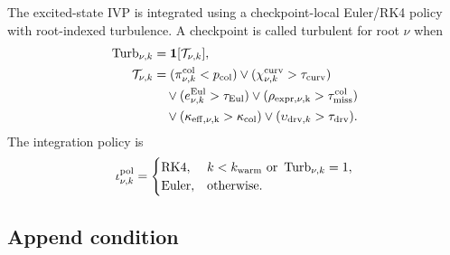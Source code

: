 \documentclass[
  reprint,
  amsmath,
  amssymb,
  aps,
  pra,
  nofootinbib,
  superscriptaddress,
  floatfix
]{revtex4-2}
\newcommand{\drv}{\mathrm{drv}}
\begin{document}
The excited-state IVP is integrated using a checkpoint-local Euler/RK4 policy with root-indexed turbulence.  A checkpoint is called turbulent for root $\nu$ when
\begin{equation}
\begin{aligned}
\operatorname{Turb}_{\nu,k}&=\mathbf 1[\mathcal T_{\nu,k}],\\
\mathcal T_{\nu,k}
&=
(\pi_{\nu,k}^{\rm col}<p_{\rm col})
\vee(\chi_{\nu,k}^{\rm curv}>\tau_{\rm curv})
\nonumber\\
&\quad\vee(e_{\nu,k}^{\rm Eul}>\tau_{\rm Eul})
\vee(\rho_{\rm expr,\nu,k}>\tau_{\rm miss}^{\rm col})
\nonumber\\
&\quad
\vee(\kappa_{\rm eff,\nu,k}>\kappa_{\rm col})
\vee(\upsilon_{\drv,k}>\tau_{\drv}).
\end{aligned}
\label{eq:excited_turbulent_period}
\end{equation}
The integration policy is
\begin{equation}
\iota_{\nu,k}^{\rm pol}=
\begin{cases}
{\rm RK4},& k<k_{\rm warm}\ \text{or}\ \operatorname{Turb}_{\nu,k}=1,\\
{\rm Euler},&\text{otherwise.}
\end{cases}
\label{eq:excited_integrator_policy}
\end{equation}

\subsection{Append condition}
\end{document}

